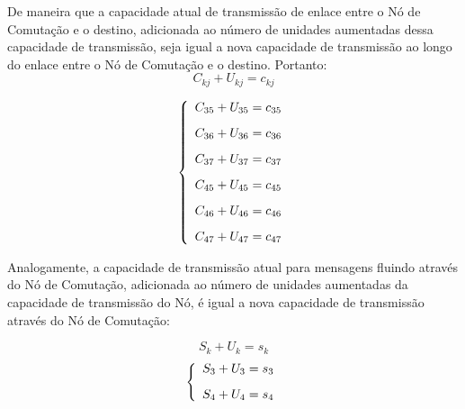 \documentclass{article}
\begin{document}
De maneira que a capacidade atual de transmissão de enlace entre o Nó de Comutação e o destino, adicionada ao número de unidades aumentadas dessa capacidade de transmissão, seja igual a nova capacidade de transmissão ao longo do enlace entre o Nó de Comutação e o destino. Portanto:
\begin{equation*}
   C_{kj} + U_{kj} = c_{kj} 
\end{equation*}

$$ \left\{
                \begin{array}{l}
                  C_{35} + U_{35} = c_{35}  \vspace{0.3cm} \\
                  
                  C_{36} + U_{36} = c_{36}  \vspace{0.3cm} \\
                  
                  C_{37} + U_{37} = c_{37}  \vspace{0.3cm} \\
                  
                  C_{45} + U_{45} = c_{45}  \vspace{0.3cm} \\
                  
                  C_{46} + U_{46} = c_{46}  \vspace{0.3cm} \\
                  
                  C_{47} + U_{47} = c_{47} 
                \end{array}
              \right. $$

Analogamente, a capacidade de transmissão atual para mensagens fluindo através do Nó de Comutação, adicionada ao número de unidades aumentadas da capacidade de transmissão do Nó, é igual a nova capacidade de transmissão através do Nó de Comutação:

\begin{equation*}
    S_{k} + U_{k} = s_{k}
\end{equation*}
        $$ \left\{
                \begin{array}{l}
                  S_{3} + U_{3} = s_{3}  \vspace{0.3cm} \\
                  
                  S_{4} + U_{4} = s_{4}
                \end{array}
              \right. $$
              
\end{document}
